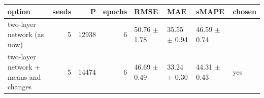 \begin{tabular}{lrrrllll}
\toprule
option & seeds & P & epochs & RMSE & MAE & sMAPE & chosen \\
\midrule
two-layer network (as now) & 5 & 12938 & 6 & 50.76 $\pm$ 1.78 & 35.55 $\pm$ 0.94 & 46.59 $\pm$ 0.74 &  \\
two-layer network + means and changes & 5 & 14474 & 6 & 46.69 $\pm$ 0.49 & 33.24 $\pm$ 0.30 & 44.31 $\pm$ 0.43 & yes \\
\bottomrule
\end{tabular}
